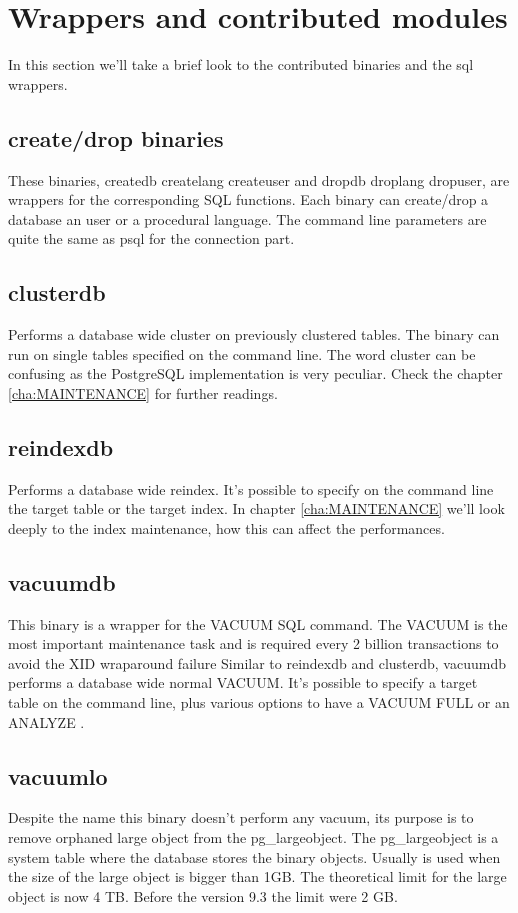 \section{Wrappers and contributed modules}
In this section we'll take a brief look to the contributed binaries and the sql wrappers.

\subsection{create/drop binaries}
These binaries, createdb createlang createuser and dropdb droplang dropuser, are wrappers for the corresponding SQL functions. 
Each binary can create/drop a database an user or a procedural language.
The command line parameters are quite the same as psql for the connection part.

\subsection{clusterdb}
Performs a database wide cluster on previously clustered tables. 
The binary can run on single tables specified on the command line.
The word cluster can be confusing as the PostgreSQL implementation is very peculiar.
Check the chapter \ref{cha:MAINTENANCE} for further readings.

\subsection{reindexdb}
Performs a database wide reindex. 
It's possible to specify on the command line the target table or the target index.
In chapter \ref{cha:MAINTENANCE} we'll look deeply to the index maintenance,
how this can affect the performances.

\subsection{vacuumdb}
This binary is a wrapper for the VACUUM  SQL command.
The VACUUM is the most important maintenance task and is required every 2 billion transactions to avoid the XID wraparound failure 
Similar to reindexdb and clusterdb, vacuumdb performs a database wide normal VACUUM.
It's possible to specify a target table on the command line, plus various options to have a VACUUM FULL  or an ANALYZE .

\subsection{vacuumlo}
Despite the name this binary doesn't perform any vacuum, its purpose is to remove orphaned large
object from the pg\_largeobject. The pg\_largeobject is a system table where the database stores
the binary objects. Usually is used when the size of the large object is bigger than 1GB.
The theoretical limit for the large object is now 4 TB. Before the version 9.3 the limit were 2 GB.


